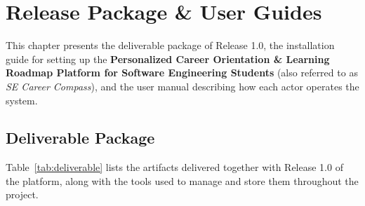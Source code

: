 \chapter{Release Package \& User Guides}

This chapter presents the deliverable package of Release 1.0, the installation guide for setting up the \textbf{Personalized Career Orientation \& Learning Roadmap Platform for Software Engineering Students} (also referred to as \textit{SE Career Compass}), and the user manual describing how each actor operates the system.

\section{Deliverable Package}

Table~\ref{tab:deliverable} lists the artifacts delivered together with Release 1.0 of the platform, along with the tools used to manage and store them throughout the project.

